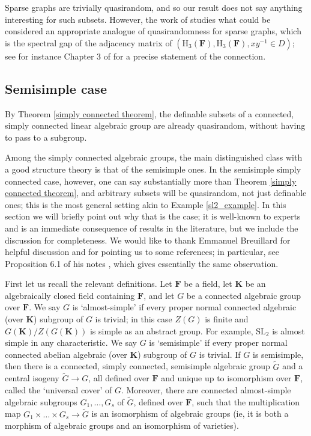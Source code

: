 \documentclass[10pt]{article}
\begin{document}
{ Sparse graphs are trivially quasirandom, and so our result does not say anything interesting for such subsets. However, the work of \cite{heisenberg_graphs} studies what could be considered an appropriate analogue of quasirandomness for sparse graphs, which is the spectral gap of the adjacency matrix of $(\mathrm{H}_3(\mathbf{F}),\mathrm{H}_3(\mathbf{F}),xy^{-1}\in D)$; see for instance Chapter 3 of \cite{zhao} for a precise statement of the connection.

 \subsection{Semisimple case}\label{semisimple case section}
By Theorem \ref{simply connected theorem}, the definable subsets of a connected, simply connected linear algebraic group are already quasirandom, without having to pass to a subgroup. 

Among the simply connected algebraic groups, the main distinguished class with a good structure theory is that of the semisimple ones. In the semisimple simply connected case, however, one can say substantially more than Theorem \ref{simply connected theorem}, and arbitrary subsets will be quasirandom, not just definable ones; this is the most general setting akin to Example \ref{sl2_example}. In this section we will briefly point out why that is the case; it is well-known to experts and is an immediate consequence of results in the literature, but we include the discussion for completeness. We would like to thank Emmanuel Breuillard for helpful discussion and for pointing us to some references; in particular, see Proposition 6.1 of his notes \cite{breuillard_2}, which gives essentially the same observation.

First let us recall the relevant definitions. Let $\mathbf{F}$ be a field, let $\mathbf{K}$ be an algebraically closed field containing $\mathbf{F}$, and let $G$ be a connected algebraic group over $\mathbf{F}$. We say $G$ is `almost-simple' if every proper normal connected algebraic (over $\mathbf{K}$) subgroup of $G$ is trivial; in this case $Z(G)$ is finite and $G(\mathbf{K})/Z(G(\mathbf{K}))$ is simple as an abstract group. For example, $\mathrm{SL}_2$ is almost simple in any characteristic. We say $G$ is `semisimple' if every proper normal connected abelian algebraic (over $\mathbf{K}$) subgroup of $G$ is trivial. If $G$ is semisimple, then there is a connected, simply connected, semisimple algebraic group $\widetilde{G}$ and a central isogeny $\widetilde{G}\to G$, all defined over $\mathbf{F}$ and unique up to isomorphism over $\mathbf{F}$, called the `universal cover' of $G$. Moreover, there are connected almost-simple algebraic subgroups $G_1,\dots,G_s$ of $\widetilde{G}$, defined over $\mathbf{F}$, such that the multiplication map $G_1\times\dots\times G_s\to\widetilde{G}$ is an isomorphism of algebraic groups (ie, it is both a morphism of algebraic groups and an isomorphism of varieties).


}
\end{document}
